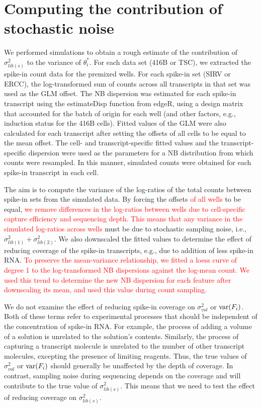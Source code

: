 \documentclass{article}
\newcommand\revised[1]{\textcolor{red}{#1}}
\begin{document}
\section{Computing the contribution of stochastic noise}
We performed simulations to obtain a rough estimate of the contribution of $\sigma^2_{lib(s)}$ to the variance of $\theta^*_i$.
For each data set (416B or TSC), we extracted the spike-in count data for the premixed wells.
For each spike-in set (SIRV or ERCC), the log-transformed sum of counts across all transcripts in that set was used as the GLM offset. 
The NB dispersion was estimated for each spike-in transcript using the estimateDisp function from edgeR, using a design matrix that accounted for the batch of origin for each well (and other factors, e.g., induction status for the 416B cells).
Fitted values of the GLM were also calculated for each transcript after setting the offsets of all cells to be equal to the mean offset.
The cell- and transcript-specific fitted values and the transcript-specific dispersion were used as the parameters for a NB distribution from which counts were resampled.
In this manner, simulated counts were obtained for each spike-in transcript in each cell.

The aim is to compute the variance of the log-ratios of the total counts between spike-in sets from the simulated data.
By forcing the offsets \revised{of all wells} to be equal, \revised{we remove differences in the log-ratios between wells due to cell-specific capture efficiency and sequencing depth.
This means that any variance in the simulated log-ratios across wells} must be due to stochastic sampling noise, i.e.,  $\sigma^2_{lib(1)} + \sigma^2_{lib(2)}$.
We also downscaled the fitted values to determine the effect of reducing coverage of the spike-in transcripts, e.g., due to addition of less spike-in RNA.
\revised{To preserve the mean-variance relationship, we fitted a loess curve of degree 1 to the log-transformed NB dispersions against the log-mean count.
We used this trend to determine the new NB dispersion for each feature after downscaling its mean, and used this value during count sampling.}

We do not examine the effect of reducing spike-in coverage on $\sigma^2_{vol}$ or $\mbox{var}(F_i)$.
Both of these terms refer to experimental processes that should be independent of the concentration of spike-in RNA.
For example, the process of adding a volume of a solution is unrelated to the solution's contents.
Similarly, the process of capturing a transcript molecule is unrelated to the number of other transcript molecules, excepting the presence of limiting reagents.
Thus, the true values of $\sigma^2_{vol}$ or $\mbox{var}(F_i)$ should generally be unaffected by the depth of coverage.
In contrast, sampling noise during sequencing depends on the coverage and will contribute to the true value of $\sigma^2_{lib(s)}$.
This means that we need to test the effect of reducing coverage on $\sigma^2_{lib(s)}$.
\end{document}
